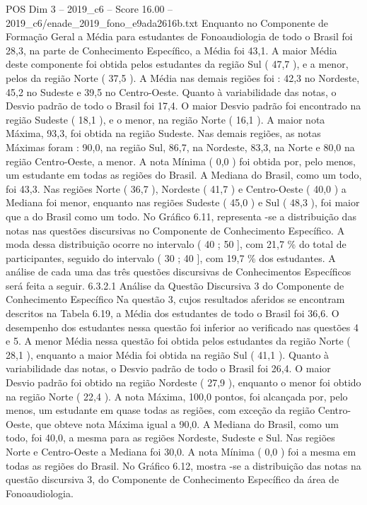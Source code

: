 \begin{textsample}{POS Dim 3 – 2019\_c6 – Score 16.00 – 2019\_c6/enade\_2019\_fono\_e9ada2616b.txt}
Enquanto no Componente de Formação Geral a Média para estudantes de Fonoaudiologia de todo o Brasil foi 28,3, na parte de Conhecimento Específico, a Média foi 43,1.
A maior Média deste componente foi obtida pelos estudantes da região Sul ( 47,7 ), e a menor, pelos da região Norte ( 37,5 ).
A Média nas demais regiões foi : 42,3 no Nordeste, 45,2 no Sudeste e 39,5 no Centro-Oeste.
Quanto à variabilidade das notas, o Desvio padrão de todo o Brasil foi 17,4.
O maior Desvio padrão foi encontrado na região Sudeste ( 18,1 ), e o menor, na região Norte ( 16,1 ).
A maior nota Máxima, 93,3, foi obtida na região Sudeste.
Nas demais regiões, as notas Máximas foram : 90,0, na região Sul, 86,7, na Nordeste, 83,3, na Norte e 80,0 na região Centro-Oeste, a menor.
A nota Mínima ( 0,0 ) foi obtida por, pelo menos, um estudante em todas as regiões do Brasil.
A Mediana do Brasil, como um todo, foi 43,3.
Nas regiões Norte ( 36,7 ), Nordeste ( 41,7 ) e Centro-Oeste ( 40,0 ) a Mediana foi menor, enquanto nas regiões Sudeste ( 45,0 ) e Sul ( 48,3 ), foi maior que a do Brasil como um todo.
No Gráfico 6.11, representa -se a distribuição das notas nas questões discursivas no Componente de Conhecimento Específico.
A moda dessa distribuição ocorre no intervalo ( 40 ; 50 ], com 21,7 \% do total de participantes, seguido do intervalo ( 30 ; 40 ], com 19,7 \% dos estudantes.
A análise de cada uma das três questões discursivas de Conhecimentos Específicos será feita a seguir. 6.3.2.1 Análise da Questão Discursiva 3 do Componente de Conhecimento Específico Na questão 3, cujos resultados aferidos se encontram descritos na Tabela 6.19, a Média dos estudantes de todo o Brasil foi 36,6.
O desempenho dos estudantes nessa questão foi inferior ao verificado nas questões 4 e 5.
A menor Média nessa questão foi obtida pelos estudantes da região Norte ( 28,1 ), enquanto a maior Média foi obtida na região Sul ( 41,1 ).
Quanto à variabilidade das notas, o Desvio padrão de todo o Brasil foi 26,4.
O maior Desvio padrão foi obtido na região Nordeste ( 27,9 ), enquanto o menor foi obtido na região Norte ( 22,4 ).
A nota Máxima, 100,0 pontos, foi alcançada por, pelo menos, um estudante em quase todas as regiões, com exceção da região Centro-Oeste, que obteve nota Máxima igual a 90,0.
A Mediana do Brasil, como um todo, foi 40,0, a mesma para as regiões Nordeste, Sudeste e Sul.
Nas regiões Norte e Centro-Oeste a Mediana foi 30,0.
A nota Mínima ( 0,0 ) foi a mesma em todas as regiões do Brasil.
No Gráfico 6.12, mostra -se a distribuição das notas na questão discursiva 3, do Componente de Conhecimento Específico da área de Fonoaudiologia.

\end{textsample}
